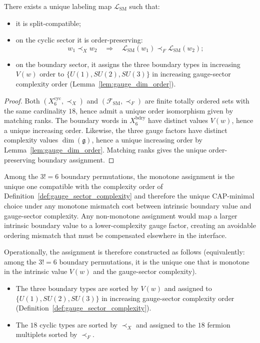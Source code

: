 \begin{theorem}\label{thm:labeling_unique}
There exists a unique labeling map $\mathcal{L}_{\mathrm{SM}}$ such that:
\begin{itemize}
\item it is split-compatible;
\item on the cyclic sector it is order-preserving:
\[
w_1\prec_X w_2\quad\Longrightarrow\quad \mathcal{L}_{\mathrm{SM}}(w_1)\prec_F \mathcal{L}_{\mathrm{SM}}(w_2);
\]
\item on the boundary sector, it assigns the three boundary types in increasing $V(w)$ order to $\{U(1),SU(2),SU(3)\}$ in increasing gauge-sector complexity order (Lemma~\ref{lem:gauge_dim_order}).
\end{itemize}
\end{theorem}
\begin{proof}
Both $(X_6^{\mathrm{cyc}},\prec_X)$ and $(\mathcal{F}_{\mathrm{SM}},\prec_F)$ are finite totally ordered sets with the same cardinality $18$, hence admit a unique order isomorphism given by matching ranks.
The boundary words in $X_6^{\mathrm{bdry}}$ have distinct values $V(w)$, hence a unique increasing order.
Likewise, the three gauge factors have distinct complexity values $\dim(\mathfrak{g})$, hence a unique increasing order by Lemma~\ref{lem:gauge_dim_order}.
Matching ranks gives the unique order-preserving boundary assignment.
\end{proof}

\begin{remark}\label{rem:boundary_monotone_cap}
Among the $3!=6$ boundary permutations, the monotone assignment is the unique one compatible with the complexity order of Definition~\ref{def:gauge_sector_complexity} and therefore the unique CAP-minimal choice under any monotone mismatch cost between intrinsic boundary value and gauge-sector complexity.
Any non-monotone assignment would map a larger intrinsic boundary value to a lower-complexity gauge factor, creating an avoidable ordering mismatch that must be compensated elsewhere in the interface.
\end{remark}

Operationally, the assignment is therefore constructed as follows (equivalently: among the $3!=6$ boundary permutations, it is the unique one that is monotone in the intrinsic value $V(w)$ and the gauge-sector complexity).
\begin{itemize}
\item The three boundary types are sorted by $V(w)$ and assigned to $\{U(1),SU(2),SU(3)\}$ in increasing gauge-sector complexity order (Definition~\ref{def:gauge_sector_complexity}).
\item The $18$ cyclic types are sorted by $\prec_X$ and assigned to the $18$ fermion multiplets sorted by $\prec_F$.
\end{itemize}

